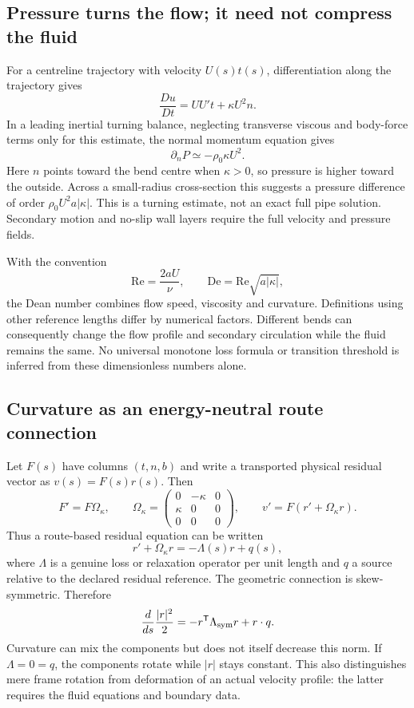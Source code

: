 \documentclass[11pt,a4paper]{article}
\begin{document}
\subsection{Pressure turns the flow; it need not compress the fluid}
For a centreline trajectory with velocity $U(s)t(s)$, differentiation along
the trajectory gives
\[
\frac{Du}{Dt}=UU't+\kappa U^2 n.
\]
In a leading inertial turning balance, neglecting transverse viscous and
body-force terms only for this estimate, the normal momentum equation gives
\[
\partial_nP\simeq-\rho_0\kappa U^2.
\]
Here $n$ points toward the bend centre when $\kappa>0$, so pressure is
higher toward the outside. Across a small-radius cross-section this suggests
a pressure difference of order $\rho_0U^2a|\kappa|$.
This is a turning estimate, not an exact full pipe solution. Secondary
motion and no-slip wall layers require the full velocity and pressure fields.

With the convention
\[
\mathrm{Re}=\frac{2aU}{\nu},\qquad
\mathrm{De}=\mathrm{Re}\sqrt{a|\kappa|},
\]
the Dean number combines flow speed, viscosity and curvature. Definitions
using other reference lengths differ by numerical factors. Different bends
can consequently change the flow profile and secondary circulation while
the fluid remains the same. No universal monotone loss formula or transition
threshold is inferred from these dimensionless numbers alone.

\subsection{Curvature as an energy-neutral route connection}
Let $F(s)$ have columns $(t,n,b)$ and write a transported physical residual
vector as $v(s)=F(s)r(s)$. Then
\[
F'=F\Omega_\kappa,\qquad
\Omega_\kappa=
\begin{pmatrix}0&-\kappa&0\\\kappa&0&0\\0&0&0\end{pmatrix},
\qquad v'=F(r'+\Omega_\kappa r).
\]
Thus a route-based residual equation can be written
\begin{equation}
\label{eq:curved-route-residual}
r'+\Omega_\kappa r=-\Lambda(s)r+q(s),
\end{equation}
where $\Lambda$ is a genuine loss or relaxation operator per unit length
and $q$ a source relative to the declared residual reference. The geometric
connection is skew-symmetric. Therefore
\[
\frac{d}{ds}\frac{|r|^2}{2}
=-r^{\mathsf T}\Lambda_{\rm sym}r+r\cdot q.
\]
Curvature can mix the components but does not itself decrease this norm.
If $\Lambda=0=q$, the components rotate while $|r|$ stays constant.
This also distinguishes mere frame rotation from deformation of an actual
velocity profile: the latter requires the fluid equations and boundary data.
\end{document}
